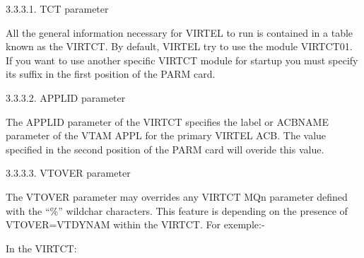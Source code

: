 \documentclass[letterpaper,10pt,english]{sphinxmanual}
\begin{document}
\begin{sphinxVerbatim}[commandchars=\\\{\}]
\end{sphinxVerbatim}

3.3.3.1. TCT parameter

All the general information necessary for VIRTEL to run is contained in a table known as the VIRTCT. By default, VIRTEL
try to use the module VIRTCT01. If you want to use another specific VIRTCT module for startup you must specify its
suffix in the first position of the PARM card.

3.3.3.2. APPLID parameter

The APPLID parameter of the VIRTCT specifies the label or ACBNAME parameter of the VTAM APPL for the primary
VIRTEL ACB. The value specified in the second position of the PARM card will overide this value.

3.3.3.3. VTOVER parameter

The VTOVER parameter may overrides any VIRTCT MQn parameter defined with the “\%” wildchar characters. This
feature is depending on the presence of VTOVER=VTDYNAM within the VIRTCT. For exemple:-

In the VIRTCT:
\end{document}
